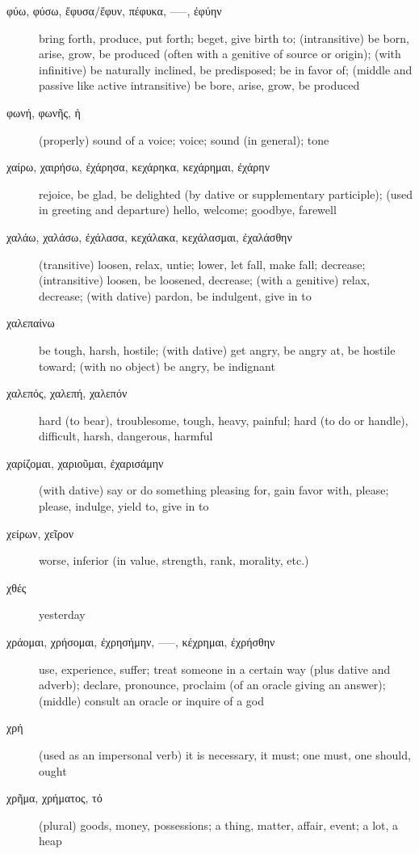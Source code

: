 \documentclass[12pt,letterpaper]{article}
\begin{document}
\begin{description}
    \item[\textgreek{φύω, φύσω, ἔφυσα/ἔφυν, πέφυκα, –––, ἐφύην}] \marginnote{*}bring forth, produce, put forth; beget, give birth to; (intransitive) be born, arise, grow, be produced (often with a genitive of source or origin); (with infinitive) be naturally inclined, be predisposed; be in favor of; (middle and passive like active intransitive) be bore, arise, grow, be produced
    \item[\textgreek{φωνή, φωνῆς, ἡ}] \marginnote{*}(properly) sound of a voice; voice; sound (in general); tone
    \item[\textgreek{χαίρω, χαιρήσω, ἐχάρησα, κεχάρηκα, κεχάρημαι, ἐχάρην}] \marginnote{*}rejoice, be glad, be delighted (by dative or supplementary participle); (used in greeting and departure) hello, welcome; goodbye, farewell
    \item[\textgreek{χαλάω, χαλάσω, ἐχάλασα, κεχάλακα, κεχάλασμαι, ἐχαλάσθην}] (transitive) loosen, relax, untie; lower, let fall, make fall; decrease; (intransitive) loosen, be loosened, decrease; (with a genitive) relax, decrease; (with dative) pardon, be indulgent, give in to
    \item[\textgreek{χαλεπαίνω}] be tough, harsh, hostile; (with dative) get angry, be angry at, be hostile toward; (with no object) be angry, be indignant
    \item[\textgreek{χαλεπός, χαλεπή, χαλεπόν}] \marginnote{*}hard (to bear), troublesome, tough, heavy, painful; hard (to do or handle), difficult, harsh, dangerous, harmful
    \item[\textgreek{χαρίζομαι, χαριοῦμαι, ἐχαρισάμην}] (with dative) say or do something pleasing for, gain favor with, please; please, indulge, yield to, give in to
    \item[\textgreek{χείρων, χεῖρον}] \marginnote{*}worse, inferior (in value, strength, rank, morality, etc.)
    \item[\textgreek{χθές}] yesterday
    \item[\textgreek{χράομαι, χρήσομαι, ἐχρησήμην, –––, κέχρημαι, ἐχρήσθην}] \marginnote{*}use, experience, suffer; treat someone in a certain way (plus dative and adverb); declare, pronounce, proclaim (of an oracle giving an answer); (middle) consult an oracle or inquire of a god
    \item[\textgreek{χρή}] \marginnote{*}(used as an impersonal verb) it is necessary, it must; one must, one should, ought
    \item[\textgreek{χρῆμα, χρήματος, τό}] \marginnote{*}(plural) goods, money, possessions; a thing, matter, affair, event; a lot, a heap

\end{description}
\end{document}
